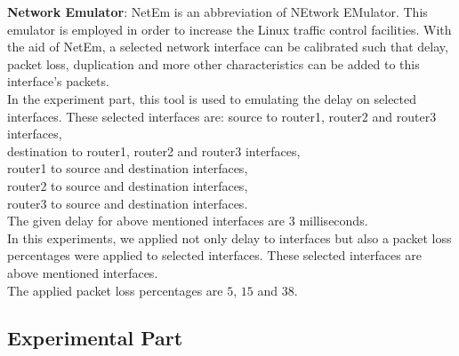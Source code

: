 \documentclass[conference]{IEEEtran}
\begin{document}
\textbf{Network Emulator}:
NetEm is an abbreviation of NEtwork EMulator. This emulator is employed in order to increase the Linux traffic control facilities. With the aid of NetEm, a selected network interface can be calibrated such that delay, packet loss, duplication and more other characteristics can be added to this interface's packets.\\
In the experiment part, this tool is used to emulating the delay on selected interfaces. These selected interfaces are: 
source to router1, router2 and router3 interfaces,\\
destination to router1, router2 and router3 interfaces,\\
router1 to source and destination interfaces,\\
router2 to source and destination interfaces,\\
router3 to source and destination interfaces.\\
The given delay for above mentioned interfaces are 3 milliseconds.\\
In this experiments, we applied not only delay to interfaces but also a packet loss percentages were applied to selected interfaces. These selected interfaces are above mentioned interfaces.\\
The applied packet loss percentages are $5$, $15$ and $38$.\\

\subsection{Experimental Part}
\end{document}
